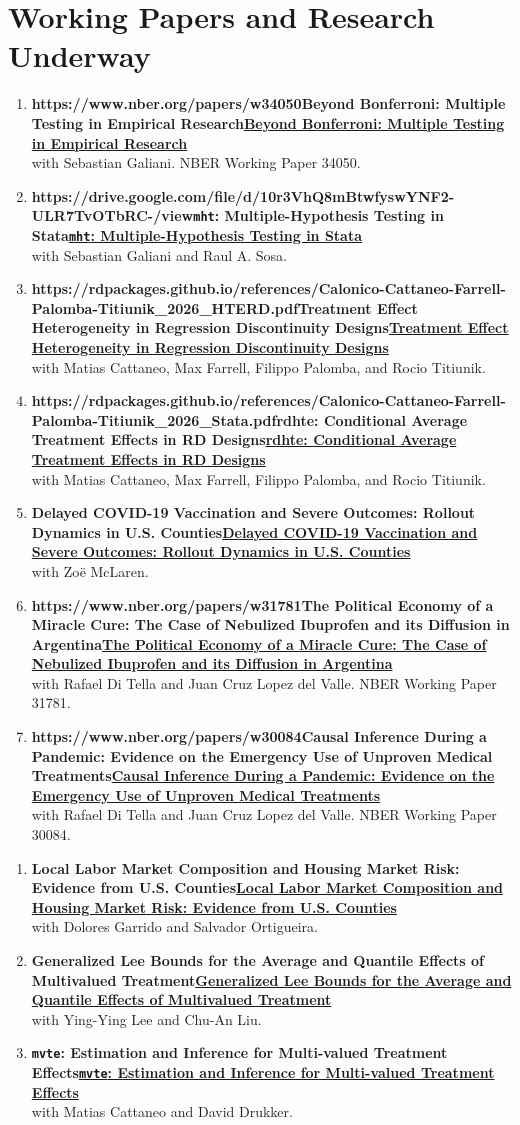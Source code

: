 \documentclass[11pt]{article}
\let\cvsection\section
\renewcommand{\section}{\Needspace{8\baselineskip}\cvsection}
\newcommand{\subhead}[1]{\Needspace{5\baselineskip}\vspace{7pt}{\sffamily\footnotesize\bfseries\color{ink}#1}\par\vspace{1pt}}
\newcommand{\pub}[4]{\item \begin{minipage}[t]{\linewidth}\raggedright
  {\bfseries\def\puburl{#1}\ifx\puburl\empty #2\else\href{#1}{#2}\fi}\\[-0.5pt]%
  {\sffamily\footnotesize\color{muted}#3}%
  \def\pubvenue{#4}\ifx\pubvenue\empty\else\\[-0.5pt]{\small #4}\fi\strut\end{minipage}}
\begin{document}
\section{Working Papers and Research Underway}
\noindent\subhead{Working Papers}
\begin{enumerate}[leftmargin=*]
\pub{https://www.nber.org/papers/w34050}{Beyond Bonferroni: Multiple Testing in Empirical Research}{with Sebastian Galiani. NBER Working Paper 34050.}{}

\pub{https://drive.google.com/file/d/10r3VhQ8mBtwfyswYNF2-ULR7TvOTbRC-/view}{\texttt{mht}: Multiple-Hypothesis Testing in Stata}{with Sebastian Galiani and Raul A. Sosa.}{}

\pub{https://rdpackages.github.io/references/Calonico-Cattaneo-Farrell-Palomba-Titiunik_2026_HTERD.pdf}{Treatment Effect Heterogeneity in Regression Discontinuity Designs}{with Matias Cattaneo, Max Farrell, Filippo Palomba, and Rocio Titiunik.}{}

\pub{https://rdpackages.github.io/references/Calonico-Cattaneo-Farrell-Palomba-Titiunik_2026_Stata.pdf}{rdhte: Conditional Average Treatment Effects in RD Designs}{with Matias Cattaneo, Max Farrell, Filippo Palomba, and Rocio Titiunik.}{}

\pub{}{Delayed COVID-19 Vaccination and Severe Outcomes: Rollout Dynamics in U.S. Counties}{with Zoë McLaren.}{}

\pub{https://www.nber.org/papers/w31781}{The Political Economy of a Miracle Cure: The Case of Nebulized Ibuprofen and its Diffusion in Argentina}{with Rafael Di Tella and Juan Cruz Lopez del Valle. NBER Working Paper 31781.}{}

\pub{https://www.nber.org/papers/w30084}{Causal Inference During a Pandemic: Evidence on the Emergency Use of Unproven Medical Treatments}{with Rafael Di Tella and Juan Cruz Lopez del Valle. NBER Working Paper 30084.}{}
\end{enumerate}


\noindent\subhead{Work in Progress}
\begin{enumerate}[leftmargin=*]
\pub{}{Local Labor Market Composition and Housing Market Risk: Evidence from U.S. Counties}{with Dolores Garrido and Salvador Ortigueira.}{}

\pub{}{Generalized Lee Bounds for the Average and Quantile Effects of Multivalued Treatment}{with Ying-Ying Lee and Chu-An Liu.}{}

\pub{}{\texttt{mvte}: Estimation and Inference for Multi-valued Treatment Effects}{with Matias Cattaneo and David Drukker.}{}
\end{enumerate} 
\end{document}
